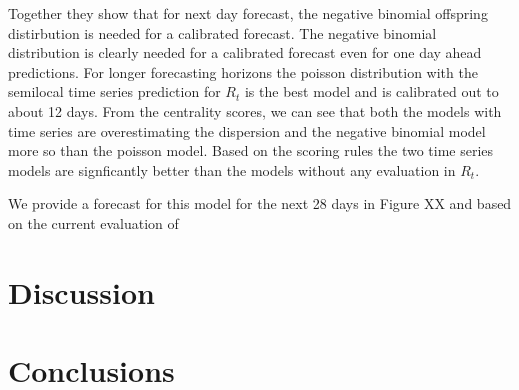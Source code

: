 \documentclass[12pt]{article}
\begin{document}
Together they show that for next day forecast, the negative binomial offspring distirbution is needed for a calibrated forecast. The negative binomial distribution is clearly needed for a calibrated forecast even for one day ahead predictions. For longer forecasting horizons the poisson distribution with the semilocal time series prediction for $R_t$ is the best model and is calibrated out to about 12 days. From the centrality scores, we can see that both the models with time series are overestimating the dispersion and the negative binomial model more so than the poisson model. Based on the scoring rules the two time series models are signficantly better than the models without any evaluation in $R_t$.

We provide a forecast for this model for the next 28 days in Figure XX and based on the current evaluation of 



\section{Discussion}






\section{Conclusions}

\newpage

 

\end{document}
